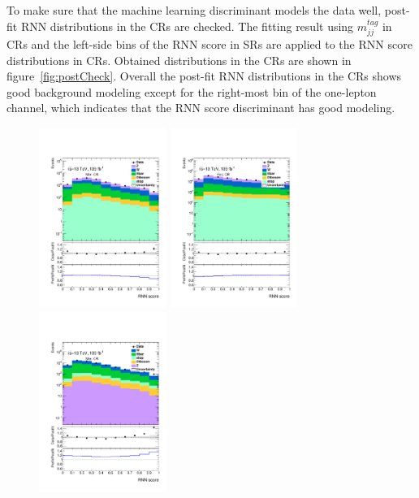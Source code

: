 To make sure that the machine learning discriminant models the data well, post-fit RNN distributions in the CRs are checked.
The fitting result using $m^{tag}_{jj}$ in CRs and the left-side bins of the RNN score in SRs are applied to the RNN score distributions in CRs. 
Obtained distributions in the CRs are shown in figure~\ref{fig:postCheck}. 
Overall the post-fit RNN distributions in the CRs shows good background modeling except for the right-most bin of the one-lepton channel, which indicates that the RNN score discriminant has good modeling.
\begin{figure}[ht]
    \centering
    \includegraphics[width=0.37\textwidth]{figures/validation/Region_distRNN_DCRVjetMer_BMin0_J0_incJet1_L0_T0_incFat1_Y6051_incTag1_Fat1.pdf}
    \includegraphics[width=0.37\textwidth]{figures/validation/Region_distRNN_DCRVjetFid_BMin0_T0_Y6051_incTag1_J2_L0_incJet1.pdf}
    \includegraphics[width=0.37\textwidth]{figures/validation/Region_distRNN_DCRVjetMerged_BMin0_J0_incJet1_L1_T0_incFat1_Y6051_incTag1_Fat1.pdf}

\end{figure}
